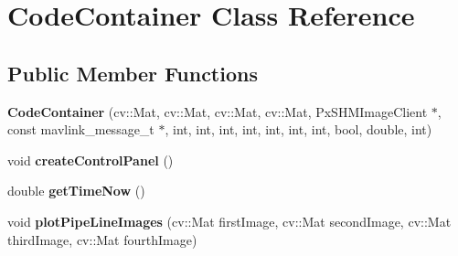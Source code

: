 \hypertarget{classCodeContainer}{
\section{CodeContainer Class Reference}
\label{classCodeContainer}
}
\subsection*{Public Member Functions}
\begin{DoxyCompactItemize}
\item 
\hypertarget{classCodeContainer_a6386ca1477e64ba021115c6e869773d0}{
{\bfseries CodeContainer} (cv::Mat, cv::Mat, cv::Mat, cv::Mat, PxSHMImageClient $\ast$, const mavlink\_\-message\_\-t $\ast$, int, int, int, int, int, int, int, bool, double, int)}
\label{classCodeContainer_a6386ca1477e64ba021115c6e869773d0}

\item 
\hypertarget{classCodeContainer_a70a3f228bf3526fc607aa79e655a90b7}{
void {\bfseries createControlPanel} ()}
\label{classCodeContainer_a70a3f228bf3526fc607aa79e655a90b7}

\item 
\hypertarget{classCodeContainer_afed6984cc61d3eb19820fbf49283421f}{
double {\bfseries getTimeNow} ()}
\label{classCodeContainer_afed6984cc61d3eb19820fbf49283421f}

\item 
\hypertarget{classCodeContainer_a6855356aa294c9f336d904b07870f57a}{
void {\bfseries plotPipeLineImages} (cv::Mat firstImage, cv::Mat secondImage, cv::Mat thirdImage, cv::Mat fourthImage)}
\label{classCodeContainer_a6855356aa294c9f336d904b07870f57a}

\end{DoxyCompactItemize}
